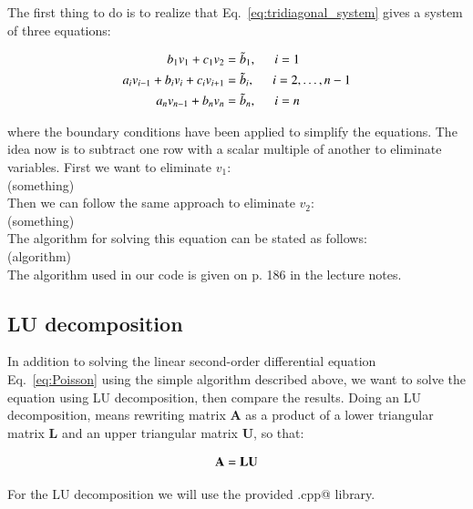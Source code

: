 \documentclass{article}
\begin{document}
\begin{multicols}{2}
The first thing to do is to realize that Eq.~\ref{eq:tridiagonal_system} gives a system of three equations:

\begin{align}
	b_1 v_1 + c_1 v_2 &= \tilde{b}_1, \hspace{0.5cm} i = 1  \\
	a_i v_{i-1} + b_i v_i + c_i v_{i+1} &= \tilde{b}_i, \hspace{0.5cm} i = 2, \dots, n - 1 \\
	a_n v_{n-1} + b_n v_n &= \tilde{b}_n, \hspace{0.5cm} i = n  
\end{align}


\noindent where the boundary conditions have been applied to simplify the equations. The idea now is to subtract one row with a scalar multiple of another to eliminate variables. First we want to eliminate $v_1$:\\

(something)\\

\noindent Then we can follow the same approach to eliminate $v_2$:\\

(something)\\

\noindent The algorithm for solving this equation can be stated as follows:\\

(algorithm)\\

\noindent The algorithm used in our code is given on p. 186 in the lecture notes.

\subsection{LU decomposition}
In addition to solving the linear second-order differential equation Eq.~\ref{eq:Poisson} using the simple algorithm described above, we want to solve the equation using LU decomposition, then compare the results. Doing an LU decomposition, means rewriting matrix {\bf A} as a product of a lower triangular matrix {\bf L} and an upper triangular matrix {\bf U}, so that:

\begin{equation*}
	{\bf A} = {\bf L}{\bf U}
\end{equation*}

\noindent For the LU decomposition we will use the provided \verb@lib.cpp@ library.





\end{multicols}
\end{document}

